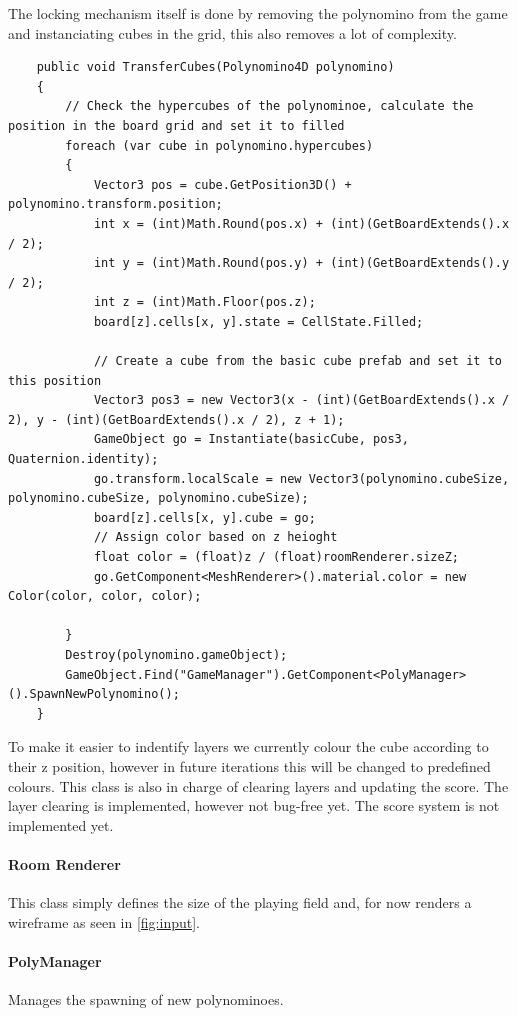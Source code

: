 \documentclass{article}
\begin{document}
The locking mechanism itself is done by removing the polynomino from the game and instanciating cubes in the grid, this also removes a lot of complexity.
\begin{verbatim}
    public void TransferCubes(Polynomino4D polynomino)
    {
        // Check the hypercubes of the polynominoe, calculate the position in the board grid and set it to filled
        foreach (var cube in polynomino.hypercubes)
        {
            Vector3 pos = cube.GetPosition3D() + polynomino.transform.position;
            int x = (int)Math.Round(pos.x) + (int)(GetBoardExtends().x / 2);
            int y = (int)Math.Round(pos.y) + (int)(GetBoardExtends().y / 2);
            int z = (int)Math.Floor(pos.z);
            board[z].cells[x, y].state = CellState.Filled;
 
            // Create a cube from the basic cube prefab and set it to this position
            Vector3 pos3 = new Vector3(x - (int)(GetBoardExtends().x / 2), y - (int)(GetBoardExtends().x / 2), z + 1);
            GameObject go = Instantiate(basicCube, pos3, Quaternion.identity);
            go.transform.localScale = new Vector3(polynomino.cubeSize, polynomino.cubeSize, polynomino.cubeSize);
            board[z].cells[x, y].cube = go;
            // Assign color based on z heioght
            float color = (float)z / (float)roomRenderer.sizeZ;
            go.GetComponent<MeshRenderer>().material.color = new Color(color, color, color);
 
        }
        Destroy(polynomino.gameObject);
        GameObject.Find("GameManager").GetComponent<PolyManager>().SpawnNewPolynomino();
    }
\end{verbatim}
To make it easier to indentify layers we currently colour the cube according to their z position, however in future iterations this will be changed to predefined colours.
This class is also in charge of clearing layers and updating the score. The layer clearing is implemented, however not bug-free yet. The score system is not implemented yet.

\paragraph{Room Renderer}
This class simply defines the size of the playing field and, for now renders a wireframe as seen in \ref{fig:input}.

\paragraph{PolyManager}
Manages the spawning of new polynominoes. 
\end{document}
